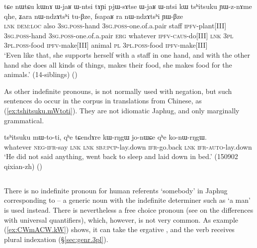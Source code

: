 \begin{exe}
\ex \label{ex:tshitsuku.YWznAme}
\gll  tɕe nɯtɕu kɯnɤ ɯ-jaʁ ɯ-ntsi tɤɲi pjɯ-sɤtse  ɯ-jaʁ ɯ-ntsi kɯ tsʰitsuku ɲɯ-z-nɤme qhe, ʑara nɯ-ndzɤtsʰi tu-βze, fsapaʁ ra nɯ-ndzɤtsʰi ɲɯ-βze \\
\textsc{lnk} \textsc{dem}:\textsc{loc} also \textsc{3sg}.\textsc{poss}-hand \textsc{3sg}.\textsc{poss}-one.of.a.pair staff \textsc{ipfv}-plant[III]  \textsc{3sg}.\textsc{poss}-hand \textsc{3sg}.\textsc{poss}-one.of.a.pair \textsc{erg} whatever \textsc{ipfv}-\textsc{caus}-do[III] \textsc{lnk} \textsc{3pl} \textsc{3pl}.\textsc{poss}-food \textsc{ipfv}-make[III] animal \textsc{pl} \textsc{3pl}.\textsc{poss}-food \textsc{ipfv}-make[III]  \\
\glt `Even like that, she supports herself with a staff in one hand, and with the other hand she does all kinds of things, makes their food, she makes food for the animals.' (14-siblings) ()
\end{exe}

As other indefinite pronouns,  is not normally used with negation, but such sentences do occur in the corpus in translations from Chinese, as (\ref{ex:tshitsuku.mWtoti}). They are not idiomatic Japhug, and only marginally grammatical.

\begin{exe}
\ex \label{ex:tshitsuku.mWtoti}
\gll   tsʰitsuku mɯ-to-ti, qʰe tɕendɤre kɯ-rŋgɯ jo-nɯɕe qʰe ko-nɯ-rŋgɯ. \\
whatever \textsc{neg}-\textsc{ifr}-say \textsc{lnk} \textsc{lnk} \textsc{sbj}:\textsc{pcp}-lay.down \textsc{ifr}-go.back \textsc{lnk} \textsc{ifr}-\textsc{auto}-lay.down \\
\glt `He did not said anything, went back to sleep and laid down in bed.' (150902 qixian-zh) ()
\end{exe}

 \subsection{} \label{sex:CWmACW}
 There is no indefinite pronoun for human referents `somebody' in Japhug  corresponding to  -- a generic noun with the indefinite determiner  such as  `a man' is used instead. There is nevertheless a free choice pronoun  (see \citealt[48--52]{haspelmath97indef} on the differences with universal quantifiers), which, however, is not very common. As example (\ref{ex:CWmACW.kW}) shows, it can take the ergative , and the verb receives plural indexation (§\ref{sec:genr.3pl}). 
 
